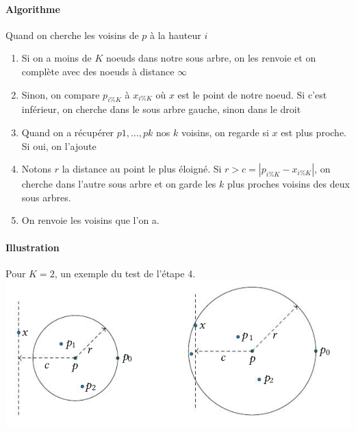 \paragraph{Algorithme} Quand on cherche les voisins de $p$ à la hauteur $i$
\begin{enumerate}
	\item Si on a moins de $K$ noeuds dans notre sous arbre, on les renvoie et on complète avec des noeuds à distance $\infty$
	\item Sinon, on compare $p_{i\%K}$ à $x_{i\%K}$ où $x$ est le point de notre noeud. Si c'est inférieur, on cherche dans le sous arbre gauche, sinon dans le droit
	\item Quand on a récupérer $p1, \dots, pk$ nos $k$ voisins, on regarde si $x$ est plus proche. Si oui, on l'ajoute
	\item Notons $r$ la distance au point le plus éloigné. Si $r > c = \left|p_{i\%K} - x_{i\%K}\right|$, on cherche dans l'autre sous arbre et on garde les $k$ plus proches voisins des deux sous arbres.
	\item On renvoie les voisins que l'on a. 
\end{enumerate}

\paragraph{Illustration} Pour $K = 2$, un exemple du test de l'étape 4.\\
\includegraphics[scale = 0.4]{Developpements/arbre kdim/exemple_echec.png}

